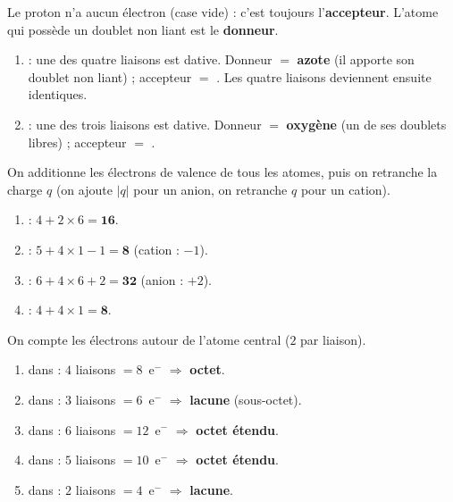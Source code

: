 \documentclass[11pt,a4paper]{article}
\begin{document}
\begin{corrige}
Le proton  n'a aucun électron (case vide) : c'est toujours l'\textbf{accepteur}. L'atome
qui possède un doublet non liant est le \textbf{donneur}.
\begin{enumerate}[label=\alph*)]
  \item {} : une des quatre liaisons  est dative. Donneur $=$ \textbf{azote}
        (il apporte son doublet non liant) ; accepteur $=$ \textbf{}. Les quatre liaisons
        deviennent ensuite identiques.
  \item {} : une des trois liaisons  est dative. Donneur $=$ \textbf{oxygène}
        (un de ses doublets libres) ; accepteur $=$ \textbf{}.
\end{enumerate}
\end{corrige}

\begin{corrige}
On additionne les électrons de valence de tous les atomes, puis on retranche la charge $q$
(on ajoute $|q|$ pour un anion, on retranche $q$ pour un cation).
\begin{enumerate}[label=\alph*)]
  \item {} : $4 + 2\times 6 = \mathbf{16}$.
  \item {} : $5 + 4\times 1 - 1 = \mathbf{8}$ (cation : $-1$).
  \item {} : $6 + 4\times 6 + 2 = \mathbf{32}$ (anion : $+2$).
  \item {} : $4 + 4\times 1 = \mathbf{8}$.
\end{enumerate}
\end{corrige}

\begin{corrige}
On compte les électrons autour de l'atome central ($2$ par liaison).
\begin{enumerate}[label=\alph*)]
  \item {} dans  : $4$ liaisons $= 8$~e$^-$ $\Rightarrow$ \textbf{octet}.
  \item {} dans  : $3$ liaisons $= 6$~e$^-$ $\Rightarrow$ \textbf{lacune} (sous-octet).
  \item {} dans  : $6$ liaisons $= 12$~e$^-$ $\Rightarrow$ \textbf{octet étendu}.
  \item {} dans  : $5$ liaisons $= 10$~e$^-$ $\Rightarrow$ \textbf{octet étendu}.
  \item {} dans  : $2$ liaisons $= 4$~e$^-$ $\Rightarrow$ \textbf{lacune}.
\end{enumerate}
\end{corrige}
\end{document}
